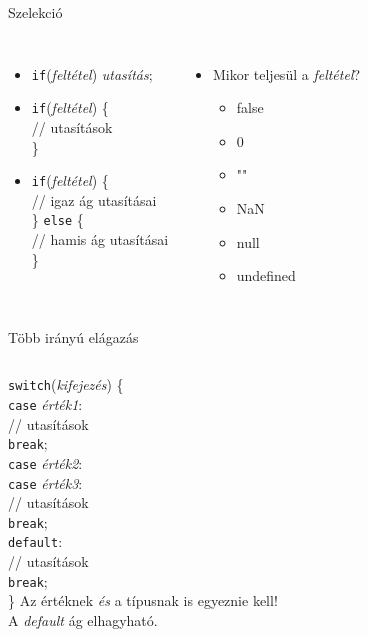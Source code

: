 \begin{frame}
    Szelekció
    \begin{columns}[T]
        \begin{itemize}
          \item \texttt{if}(\emph{feltétel}) \emph{utasítás};
          \item \texttt{if}(\emph{feltétel}) \{\\
          \qquad // utasítások \\
          \}
          \item \texttt{if}(\emph{feltétel}) \{ \\
            \qquad // igaz ág utasításai \\
            \} \texttt{else} \{ \\
            \qquad // hamis ág utasításai \\
            \}
        \end{itemize}
        \begin{itemize}
          \item Mikor  teljesül a \emph{feltétel}?
          \begin{itemize}
            \item false
            \item 0
            \item ""
            \item NaN
            \item null
            \item undefined
          \end{itemize}
        \end{itemize}
      \end{columns}
\end{frame}

\begin{frame}
    Több irányú elágazás
    \begin{columns}[T]
        \texttt{switch}(\emph{kifejezés}) \{ \\
        \qquad \texttt{case} \emph{érték1}: \\
        \qquad \qquad // utasítások \\
        \qquad \qquad \texttt{break}; \\
        \qquad \texttt{case} \emph{érték2}: \\
        \qquad \texttt{case} \emph{érték3}: \\
        \qquad \qquad // utasítások \\
        \qquad \qquad \texttt{break}; \\
        \qquad \texttt{default}: \\
        \qquad \qquad // utasítások \\
        \qquad \qquad \texttt{break}; \\
        \}
        Az értéknek \emph{és} a típusnak is egyeznie kell! \\
        A \emph{default} ág elhagyható.
    \end{columns}
\end{frame}


